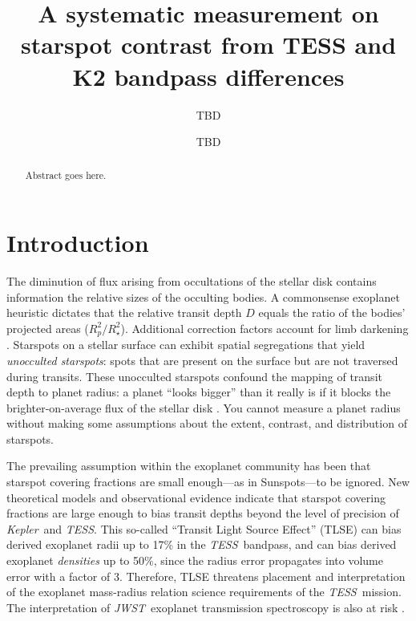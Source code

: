 \documentclass[twocolumn]{aastex631}
\newcommand{\tess}{{\it TESS}}
\newcommand{\jwst}{{\it JWST}}
\newcommand{\kepler}{{\it Kepler}}
\begin{document}
\title{A systematic measurement on starspot contrast from TESS and K2
  bandpass differences}

\author{TBD}

\author{TBD}


\begin{abstract}

  Abstract goes here.

\end{abstract}


\section{Introduction}\label{sec:intro}

The diminution of flux arising from occultations of the stellar disk contains information the relative sizes of the occulting bodies.  A commonsense exoplanet heuristic dictates that the relative transit depth $D$ equals the ratio of the bodies' projected areas ($R_p^2/R_\star^2$).  Additional correction factors account for limb darkening \citep{2002ApJ...580L.171M}.  Starspots on a stellar surface can exhibit spatial segregations
that yield \emph{unocculted starspots}: spots that are present on the surface but are not traversed during transits.  These unocculted starspots confound the mapping of transit depth to planet radius: a planet ``looks bigger'' than it really is if it blocks the brighter-on-average flux of the stellar disk \citep{2018AJ....156...91M}.  You cannot measure a planet radius without making some assumptions about the extent, contrast, and distribution of starspots.

The prevailing assumption within the exoplanet community has been that starspot covering fractions are small enough---as in Sunspots---to be ignored.  New theoretical models \citep{2018ApJ...853..122R} and observational evidence \citep{2016MNRAS.463.2494F} indicate that starspot covering fractions are large enough to bias transit depths beyond the level of precision of \kepler\ and \tess.  This so-called ``Transit Light Source Effect'' (TLSE) can bias derived exoplanet radii up to 17\% in the \tess\ bandpass, and can bias derived exoplanet \emph{densities} up to 50\%, since the radius error propagates into volume error with a factor of 3.  Therefore, TLSE threatens placement and interpretation of the exoplanet mass-radius relation science requirements of the \tess\ mission.  The interpretation of \jwst\ exoplanet transmission spectroscopy is also at risk \citep{2019AJ....157...11W}.
\end{document}
